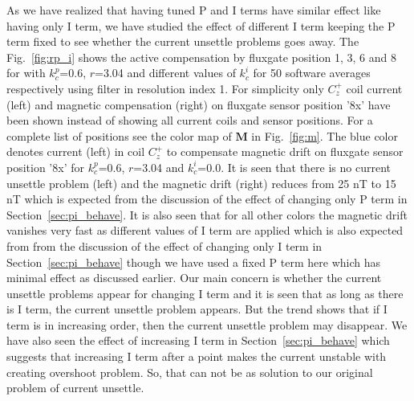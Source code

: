As we have realized that having tuned P and I terms have similar effect like
having only I term, we have studied the effect of different I term keeping the P term fixed to see whether the current unsettle problems goes away. The Fig.~\ref{fig:rp_i} shows the active compensation by fluxgate position 1, 3, 6 and 8 for with $k_c^p$=0.6, $r$=3.04 and different values of $k_c^i$ for 50 software averages respectively using filter in resolution index 1. For simplicity only $C_z^+$ coil current (left) and magnetic compensation (right) on fluxgate sensor position '8x' have been shown instead of showing all current coils and sensor positions. For a complete list of positions see the color map of $\bm{M}$ in Fig.~\ref{fig:m}.  The blue color denotes current (left) in coil $C_z^+$ to compensate magnetic drift on fluxgate sensor position '8x' for $k_c^p$=0.6, $r$=3.04 and $k_c^i$=0.0. It is seen that there is no current unsettle problem (left) and the magnetic drift (right) reduces from 25 nT to 15 nT which is expected from the discussion of the effect of changing only P term in Section~\ref{sec:pi_behave}. It is also seen that for all other colors the magnetic drift vanishes very fast as different values of I term are applied which is also expected from from the discussion of the effect of changing only I term in Section~\ref{sec:pi_behave} though we have used a fixed P term here which has minimal effect as discussed earlier. Our main concern is whether the current unsettle problems appear for changing I term and it is seen that as long as there is I term, the current unsettle problem appears. But the trend shows that if I term is in increasing order, then the current unsettle problem may disappear. We have also seen the effect of increasing I term in Section~\ref{sec:pi_behave} which suggests that increasing I term after a point makes the current unstable with creating overshoot problem. So, that can not be as solution to our original problem of current unsettle.




